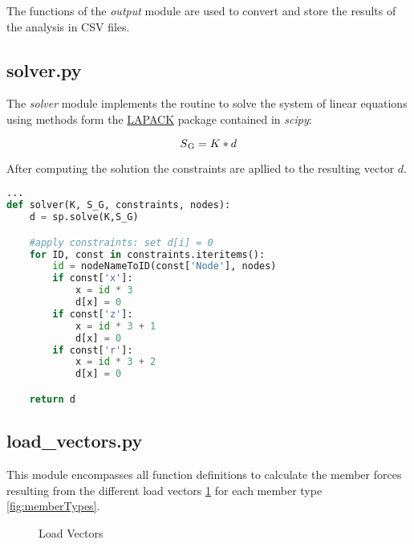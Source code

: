 The functions of the \textit{output} module are used to convert and store the results of the analysis in CSV files.

\subsection{solver.py}
\label{subsec:solver.py}

The \textit{solver} module implements the routine to solve the system of linear equations using methods form the \href{http://www.netlib.org/lapack/}{LAPACK} package contained in \textit{scipy}:

\begin{equation}
S\textsubscript{G} = K * d
\end{equation}

After computing the solution the constraints are apllied to the resulting vector $d$.

\begin{inconsolata}
\begin{lstlisting}[language=python]
...
def solver(K, S_G, constraints, nodes):
    d = sp.solve(K,S_G)

    #apply constraints: set d[i] = 0
    for ID, const in constraints.iteritems():
        id = nodeNameToID(const['Node'], nodes)
        if const['x']:
            x = id * 3
            d[x] = 0
        if const['z']:
            x = id * 3 + 1
            d[x] = 0
        if const['r']:
            x = id * 3 + 2
            d[x] = 0

    return d
\end{lstlisting}
\end{inconsolata}

\subsection{load\_vectors.py}
\label{subsec:loadvectors.py}

This module encompasses all function definitions to calculate the member forces  resulting from the different load vectors \ref{fig:loadVec} for each member type \ref{fig:memberTypes}.


\begin{figure}[h]%
    \centering
    \qquad

    \centering
    
    \caption{Load Vectors}%
    \label{fig:loadVec}%
\end{figure}


